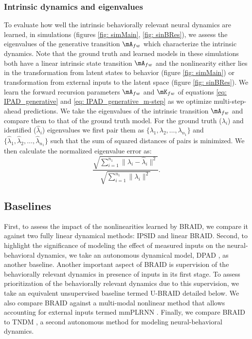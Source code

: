 \documentclass{article} %
\newcommand{\ourmethod}{BRAID}
\newcommand{\ourmethodlinear}{linear \ourmethod}
\newcommand{\ourmethodunsup}{U-\ourmethod}
\begin{document}
\subsubsection{Intrinsic dynamics and eigenvalues}\label{app: method_eigenvalues}
To evaluate how well the intrinsic behaviorally relevant neural dynamics are learned, in simulations (figures \ref{fig: simMain}, \ref{fig: sinBRes}), we assess the eigenvalues of the generative transition \(\mA_{fw}\) which characterize the intrinsic dynamics. Note that the ground truth and learned models in these simulations both have a linear intrinsic state transition \(\mA_{fw}\) and the nonlinearity either lies in the transformation from latent states to behavior (figure \ref{fig: simMain}) or transformation from external inputs to the latent space (figure \ref{fig: sinBRes}). We learn the forward recursion parameters \(\mA_{fw}\) and \(\mK_{fw}\) of equations \ref{eq: IPAD_generative} and \ref{eq: IPAD_generative_m-step} as we optimize multi-step-ahead predictions. We take the eigenvalues of the intrinsic transition \(\mA_{fw}\) and compare them to that of the ground truth model. For the ground truth ($\lambda_i$) and identified ($\hat{\lambda}_i$) eigenvalues we first pair them as $\{\lambda_1,\lambda_2,…,\lambda_{n_1}\}$ and $\{\hat{\lambda}_1,\hat{\lambda}_2,…,\hat{\lambda}_{n_1}\}$ such that the sum of squared distances of pairs is minimized. We then calculate the normalized eigenvalue error as:
\begin{equation}\label{eq: eigerror}
    \frac{\sqrt{\sum\limits_{i=1}^{n_1} \|\lambda_i - \hat{\lambda}_i\|^2}}{\sqrt{\sum\limits_{i=1}^{n_1} \|\lambda_i\|^2}}
    .
\end{equation}



\subsection{Baselines}\label{app: baselines}
First, to assess the impact of the nonlinearities learned by \ourmethod{}, we compare it against two fully linear dynamical methods: IPSID \citep{vahidi2024modeling} and \ourmethodlinear{}. Second, to highlight the significance of modeling the effect of measured inputs on the neural-behavioral dynamics, we take an autonomous dynamical model, DPAD \citep{sani2024dissociative}, as another baseline. Another important aspect of \ourmethod{} is supervision of the behaviorally relevant dynamics in presence of inputs in its first stage. To assess prioritization of the behaviorally relevant dynamics due to this supervision, we take an equivalent unsupervised baseline termed \ourmethodunsup{} detailed below. We also compare \ourmethod{} against a multi-modal nonlinear method that allows accounting for external inputs termed mmPLRNN \citep{kramer2022}. Finally, we compare \ourmethod{} to TNDM \citep{hurwitz2021targeted}, a second autonomous method for modeling neural-behavioral dynamics.
\end{document}
